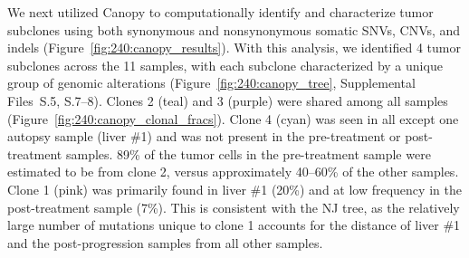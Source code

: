 We next utilized Canopy \cite{canopy} to computationally identify and characterize tumor subclones using both synonymous and nonsynonymous somatic SNVs, CNVs, and indels (Figure~\ref{fig:240:canopy_results}). With this analysis, we identified 4 tumor subclones across the 11 samples, with each subclone characterized by a unique group of genomic alterations (Figure~\ref{fig:240:canopy_tree}, Supplemental Files~S\thechapter{}.5, S\thechapter{}.7--8). Clones 2 (teal) and 3 (purple) were shared among all samples (Figure~\ref{fig:240:canopy_clonal_fracs}). Clone 4 (cyan) was seen in all except one autopsy sample (liver \#1) and was not present in the pre-treatment or post-treatment samples. 89\% of the tumor cells in the pre-treatment sample were estimated to be from clone 2, versus approximately 40--60\% of the other samples. Clone 1 (pink) was primarily found in liver \#1 (20\%) and at low frequency in the post-treatment sample (7\%). This is consistent with the NJ tree, as the relatively large number of mutations unique to clone 1 accounts for the distance of liver \#1 and the post-progression samples from all other samples.

